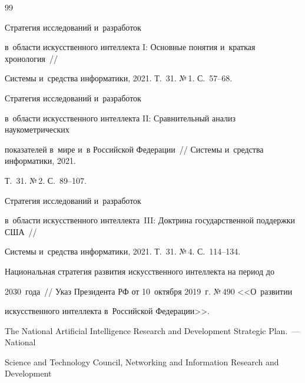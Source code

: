 {\small\frenchspacing


{%




\begin{thebibliography}{99}





\vspace*{-2pt}







 Стратегия исследований и~разработок 


в~области искусственного интеллекта I: Основные понятия и~краткая хронология~/\!\!/ 


Сис\-те\-мы и~средства информатики, 2021. Т.~31. №\,1. С.~57--68.




 Стратегия исследований и~разработок 


в~об\-ласти искусственного интеллекта II: Сравнительный анализ наукометрических 


показателей в~мире и~в Российской Федерации~/\!\!/ Сис\-те\-мы и~средства информатики, 2021. 


Т.~31. №\,2. С.~89--107.




 Стратегия исследований и~разработок 


в~об\-ласти искусственного интеллекта~III: Доктрина государственной поддержки США~/\!\!/ 


Сис\-те\-мы и~средства информатики, 2021. Т.~31. №\,4. С.~114--134.




Национальная стратегия развития искусственного интеллекта на период до 


2030~года~/\!\!/ Указ Президента РФ от 10~октября 2019~г. №\,490 <<О~развитии 


искусственного интеллекта в~Российской Федерации>>.




The National Artificial Intelligence Research and Development Strategic Plan.~---  National 


Science and Technology Council, Networking and Information Research and Development 



\end{thebibliography}}}
